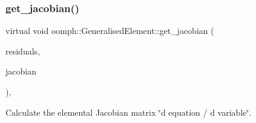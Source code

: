 \subsubsection{\texorpdfstring{get\+\_\+jacobian()}{get\_jacobian()}}
{\footnotesize\ttfamily virtual void oomph\+::\+Generalised\+Element\+::get\+\_\+jacobian (\begin{DoxyParamCaption}\item[{\hyperlink{classoomph_1_1Vector}{Vector}$<$ double $>$ \&}]{residuals,  }\item[{\hyperlink{classoomph_1_1DenseMatrix}{Dense\+Matrix}$<$ double $>$ \&}]{jacobian }\end{DoxyParamCaption})\hspace{0.3cm}{\ttfamily [inline]}, {\ttfamily [virtual]}}



Calculate the elemental Jacobian matrix \char`\"{}d equation / d variable\char`\"{}. 



